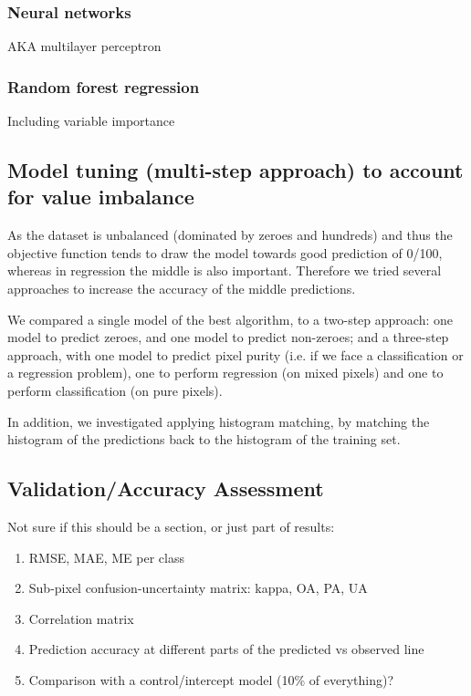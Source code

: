 \documentclass[a4paper,10pt]{article}
\begin{document}
\subsubsection{Neural networks}

AKA multilayer perceptron

\subsubsection{Random forest regression}

Including variable importance

\subsection{Model tuning (multi-step approach) to account for value imbalance}

As the dataset is unbalanced (dominated by zeroes and hundreds) and thus the objective function tends to draw the model towards good prediction of 0/100, whereas in regression the middle is also important. Therefore we tried several approaches to increase the accuracy of the middle predictions.

We compared a single model of the best algorithm, to a two-step approach: one model to predict zeroes, and one model to predict non-zeroes; and a three-step approach, with one model to predict pixel purity (i.e. if we face a classification or a regression problem), one to perform regression (on mixed pixels) and one to perform classification (on pure pixels).

In addition, we investigated applying histogram matching, by matching the histogram of the predictions back to the histogram of the training set.

\subsection{Validation/Accuracy Assessment}

Not sure if this should be a section, or just part of results:

\begin{enumerate}
 \item \ac{RMSE}, \ac{MAE}, \ac{ME} per class
 \item Sub-pixel confusion-uncertainty matrix: kappa, \ac{OA}, \ac{PA}, \ac{UA}
 \item Correlation matrix
 \item Prediction accuracy at different parts of the predicted vs observed line
 \item Comparison with a control/intercept model (10\% of everything)?
\end{enumerate}
\end{document}
